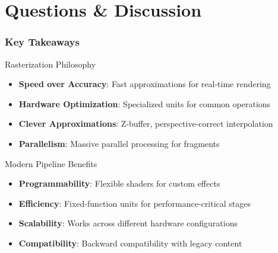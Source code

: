 \section{Questions \& Discussion}

\begin{frame}
\frametitle{Key Takeaways}

\begin{conceptbox}{Rasterization Philosophy}
\begin{itemize}
    \item \textbf{Speed over Accuracy}: Fast approximations for real-time rendering
    \item \textbf{Hardware Optimization}: Specialized units for common operations
    \item \textbf{Clever Approximations}: Z-buffer, perspective-correct interpolation
    \item \textbf{Parallelism}: Massive parallel processing for fragments
\end{itemize}
\end{conceptbox}

\begin{mathbox}{Modern Pipeline Benefits}
\begin{itemize}
    \item \textbf{Programmability}: Flexible shaders for custom effects
    \item \textbf{Efficiency}: Fixed-function units for performance-critical stages
    \item \textbf{Scalability}: Works across different hardware configurations
    \item \textbf{Compatibility}: Backward compatibility with legacy content
\end{itemize}
\end{mathbox}

\end{frame}

